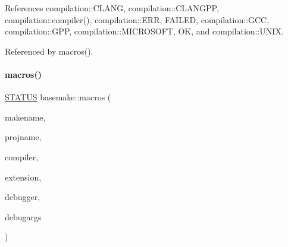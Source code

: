 \begin{DoxyCode}{0}

\end{DoxyCode}


References compilation\+::\+C\+L\+A\+NG, compilation\+::\+C\+L\+A\+N\+G\+PP, compilation\+::compiler(), compilation\+::\+E\+RR, F\+A\+I\+L\+ED, compilation\+::\+G\+CC, compilation\+::\+G\+PP, compilation\+::\+M\+I\+C\+R\+O\+S\+O\+FT, OK, and compilation\+::\+U\+N\+IX.



Referenced by macros().

\mbox{\label{namespacebasemake_acea7aefc8d03ec10fff9a8c76063bda9}} 
\paragraph{\texorpdfstring{macros()}{macros()}}
{\footnotesize\ttfamily \mbox{\hyperlink{functions_8h_a32c27cc471df37f4fc818d65de0a56c4}{S\+T\+A\+T\+US}} basemake\+::macros (\begin{DoxyParamCaption}\item[{std\+::string}]{makename,  }\item[{std\+::string}]{projname,  }\item[{\mbox{\hyperlink{namespacecompilation_ab8b552e73f4f5a4912982468f052f089}{compilation\+::\+C\+O\+M\+P\+IL}}}]{compiler,  }\item[{std\+::string}]{extension,  }\item[{\mbox{\hyperlink{namespacememorydebug_a83a201aba3c4913d2e0cca3e6f38c44f}{memorydebug\+::\+M\+M\+C\+HK}}}]{debugger,  }\item[{std\+::string}]{debugargs }\end{DoxyParamCaption})}



